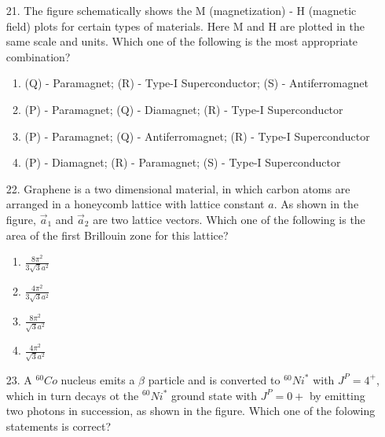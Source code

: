 \documentclass[journal]{IEEEtran}
\begin{document}
\begin{enumerate}
    \item[21.] The figure schematically shows the M (magnetization) - H (magnetic field) plots
    for certain types of materials. Here M and H are plotted in the same scale and
    units. Which one of the following is the most appropriate combination? 
    \begin{figure}[!ht]
        \centering
        \caption{}
    \end{figure}
    \begin{enumerate}[label = (\Alph*)]
        \item (Q) - Paramagnet; (R) - Type-I Superconductor; (S) - Antiferromagnet
        \item (P) - Paramagnet; (Q) - Diamagnet; (R) - Type-I Superconductor
        \item (P) - Paramagnet; (Q) - Antiferromagnet; (R) - Type-I Superconductor
        \item (P) - Diamagnet; (R) - Paramagnet; (S) - Type-I Superconductor
    \end{enumerate}
    \item[22.] Graphene is a two dimensional material, in which carbon atoms are arranged in a
    honeycomb lattice with lattice constant $a$. As shown in the figure, $\overrightarrow{a}_1$ and $\overrightarrow{a}_2$
    are two lattice vectors. Which one of the following is the area of the first Brillouin
    zone for this lattice? 
    \begin{figure}[!ht]
        \centering
        \caption{}
    \end{figure}
    \begin{enumerate}[label = (\Alph*)]
        \item $\frac{8\pi^2}{3\sqrt{3}a^2}$
        \item $\frac{4\pi^2}{3\sqrt{3}a^2}$
        \item $\frac{8\pi^2}{\sqrt{3}a^2}$
        \item $\frac{4\pi^2}{\sqrt{3}a^2}$
    \end{enumerate}
    \item[23.] A $^{60}Co$ nucleus emits a $\beta$ particle and is converted to $^{60}Ni^*$ with $J^P = 4^+$, which in turn decays ot the $^{60}Ni^*$ ground state with $J^P = 0+$ by emitting two photons in succession, as shown in the figure. Which one of the folowing statements is correct?
    \begin{figure}[!ht]

\end{figure}
\end{enumerate}
\end{document}
